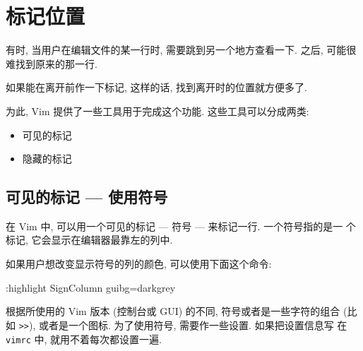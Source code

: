\section{标记位置}
\label{sec:x_marks_the_spot}

有时, 当用户在编辑文件的某一行时, 需要跳到另一个地方查看一下. 之后, 可能很
难找到原来的那一行.

如果能在离开前作一下标记, 这样的话, 找到离开时的位置就方便多了.

为此, Vim 提供了一些工具用于完成这个功能. 这些工具可以分成两类:
\begin{itemize}
    \item 可见的标记
    \item 隐藏的标记
\end{itemize}

\subsection{可见的标记 --- 使用符号}
\label{subsec:visible_markers_using_signs}

在 Vim 中, 可以用一个可见的标记 --- 符号 --- 来标记一行. 一个符号指的是一
个标记, 它会显示在编辑器最靠左的列中.

\begin{warning}
    如果用户想改变显示符号的列的颜色, 可以使用下面这个命令:
    \begin{vimcode}
    :highlight SignColumn guibg=darkgrey
    \end{vimcode}
\end{warning}

根据所使用的 Vim 版本 (控制台或 GUI) 的不同, 符号或者是一些字符的组合 (比如
\texttt{>>}), 或者是一个图标. 为了使用符号, 需要作一些设置. 如果把设置信息写
在 \texttt{vimrc} 中, 就用不着每次都设置一遍.

